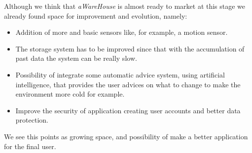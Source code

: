 \documentclass[12pt]{report}
\begin{document}
Although we think that \textit{aWareHouse} is almost ready to market at this stage we already found space for improvement and evolution, namely:
\begin{itemize}
 \item Addition of more and basic sensors like, for example, a motion sensor.
 \item The storage system has to be improved since that with the accumulation of past data the system can be really slow.
 \item Possibility of integrate some automatic advice system, using artificial intelligence, that provides the user advices on what to change to make the environment more cold for example.
 \item Improve the security of application creating user accounts and better data protection.
\end{itemize} 

We see this points as growing space, and possibility of make a better application for the final user.
\end{document}
